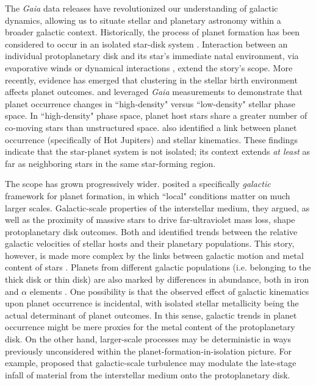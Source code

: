 \documentclass[twocolumn]{aastex631}
\begin{document}
 The \textit{Gaia} data releases \citep{prusti_gaia_2016, vallenari_gaia_2023} have revolutionized our understanding of galactic dynamics, allowing us to situate stellar and planetary astronomy within a broader galactic context. Historically, the process of planet formation has been considered to occur in an isolated star-disk system \citep{armitage_dynamics_2011, williams_protoplanetary_2011, winn_occurrence_2015}. Interaction between an individual protoplanetary disk and its star's immediate natal environment, via evaporative winds or dynamical interactions \citep{adams_photoevaporation_2004, cai_signatures_2018, de_juan_ovelar_can_2012, ansdell_alma_2017}, extend the story's scope. More recently, evidence has emerged that clustering in the stellar birth environment affects planet outcomes. \cite{winter_stellar_2020} and \cite{kruijssen_bridging_2020} leveraged \textit{Gaia} measurements to demonstrate that planet occurrence changes in ``high-density" versus ``low-density" stellar phase space. In ``high-density" phase space, planet host stars share a greater number of co-moving stars than unstructured space. \cite{hamer_hot_2019} also identified a link between planet occurrence (specifically of Hot Jupiters) and stellar kinematics. These findings indicate that the star-planet system is not isolated; its context extends \textit{at least} as far as neighboring stars in the same star-forming region. 
 
 The scope has grown progressively wider. \cite{winter_prevalent_2020} posited a specifically \textit{galactic} framework for planet formation, in which ``local" conditions matter on much larger scales. Galactic-scale properties of the interstellar medium, they argued, as well as the proximity of massive stars to drive far-ultraviolet mass loss, shape protoplanetary disk outcomes. Both \cite{bashi_small_2019} and \cite{dai_planet_2021} identified trends between the relative galactic velocities of stellar hosts and their planetary populations. This story, however, is made more complex by the links between galactic motion and metal content of stars \citep{gandhi_high-_2019}. Planets from different galactic populations (i.e. belonging to the thick disk or thin disk) are also marked by differences in abundance, both in iron and $\alpha$ elements \citep{santos_constraining_2017}. One possibility is that the observed effect of galactic kinematics upon planet occurrence is incidental, with isolated stellar metallicity being the actual determinant of planet outcomes. In this sense, galactic trends in planet occurrence might be mere proxies for the metal content of the protoplanetary disk. On the other hand, larger-scale processes may be deterministic in ways previously unconsidered within the planet-formation-in-isolation picture. For example, \cite{winter_planet_2024} proposed that galactic-scale turbulence may modulate the late-stage infall of material from the interstellar medium onto the protoplanetary disk. 
 
\end{document}
